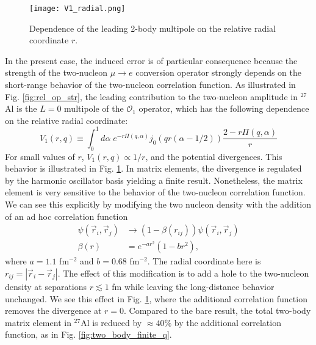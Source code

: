 \documentclass{book}[letterpaper,12pt]
\begin{document}
\begin{figure}
\centering
\texttt{[image: V1\_radial.png]}
\caption{Dependence of the leading 2-body multipole on the relative radial coordinate $r$.}
\label{fig:V1_radial}
\end{figure}

In the present case, the induced error is of particular consequence because the strength of the two-nucleon $\mu\rightarrow e$ conversion operator strongly depends on the short-range behavior of the two-nucleon correlation function. As illustrated in Fig. \ref{fig:rel_op_str}, the leading contribution to the two-nucleon amplitude in $^{27}$Al is the $L=0$ multipole of the $\mathcal{O}_1$ operator, which has the following dependence on the relative radial coordinate:
\begin{equation}
V_1(r,q)\equiv \int_0^1d\alpha\;e^{-r\Pi(q,\alpha)}j_0(qr(\alpha-1/2))\frac{2-r\Pi(q,\alpha)}{r}
\end{equation}
For small values of $r$, $V_1(r,q)\propto 1/r$, and the potential divergences. This behavior is illustrated in Fig. \ref{fig:V1_radial}. In matrix elements, the divergence is regulated by the harmonic oscillator basis yielding a finite result. Nonetheless, the matrix element is very sensitive to the behavior of the two-nucleon correlation function. We can see this explicitly by modifying the two nucleon density with the addition of an ad hoc correlation function \cite{MILLER1976562}
\begin{equation}
\begin{split}
\psi(\vec{r}_i,\vec{r}_j)&\rightarrow\left(1-\beta(r_{ij})\right)\psi(\vec{r}_i,\vec{r}_j)\\
\beta(r)&=e^{-ar^2}\left(1-br^2\right),
\label{eq:f_corr}
\end{split}
\end{equation}
where $a=1.1$ fm$^{-2}$ and $b=0.68$ fm$^{-2}$. The radial coordinate here is $r_{ij}=|\vec{r}_i-\vec{r}_j|$. The effect of this modification is to add a hole to the two-nucleon density at separations $r\lesssim 1$ fm while leaving the long-distance behavior unchanged. We see this effect in Fig. \ref{fig:V1_radial}, where the additional correlation function removes the divergence at $r=0$. Compared to the bare result, the total two-body matrix element in $^{27}$Al is reduced by $\approx 40\%$ by the additional correlation function, as in Fig. \ref{fig:two_body_finite_q}. 
\end{document}
